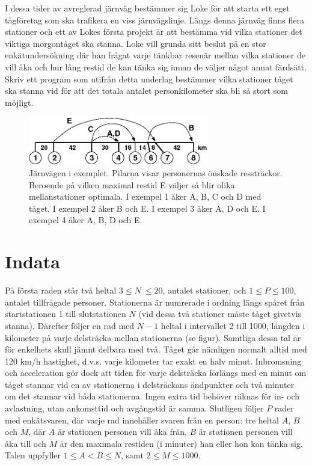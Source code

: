 
I dessa tider av avreglerad järnväg bestämmer sig Loke för att starta ett eget tågföretag som ska trafikera en viss järnvägslinje. Längs denna järnväg finns flera stationer och ett av Lokes första projekt är att bestämma vid vilka stationer det viktiga morgontåget ska stanna. Loke vill grunda sitt beslut på en stor enkätundersökning där han frågat varje tänkbar resenär mellan vilka stationer de vill åka och hur lång restid de kan tänka sig innan de väljer något annat färdsätt. Skriv ett program som utifrån detta underlag bestämmer vilka stationer tåget ska stanna vid för att det totala antalet personkilometer ska bli så stort som möjligt.

\begin{figure}[!h]
\begin{center}
\includegraphics[width=0.7\textwidth]{jarnvagen.png}
\end{center}
\caption{Järnvägen i exemplet. Pilarna visar personernas önskade ressträckor. Beroende på vilken maximal restid E väljer så blir olika mellanstationer optimala. I exempel 1 åker A, B, C och D med tåget. I exempel 2 åker B och E. I exempel 3 åker A, D och E. I exempel 4 åker A, B, D och E.}
\label{fig1}
\end{figure}

\section*{Indata}
På första raden står två heltal $3\le N\ \le 20$, antalet stationer, och $1 \le P \le 100$, antalet tillfrågade personer. Stationerna är numrerade i ordning längs spåret från startstationen 1 till slutstationen $N$ (vid dessa två stationer måste tåget givetvis stanna). Därefter följer en rad med $N-1$ heltal i intervallet 2 till 1000, längden i kilometer på varje delsträcka mellan stationerna (se figur). Samtliga dessa tal är för enkelhets skull jämnt delbara med två. Tåget går nämligen normalt alltid med 120 km/h hastighet, d.v.s. varje kilometer tar exakt en halv minut. Inbromsning och acceleration gör dock att tiden för varje delsträcka förlängs med en minut om tåget stannar vid en av stationerna i delsträckans ändpunkter och två minuter om det stannar vid båda stationerna. Ingen extra tid behöver räknas för in- och avlastning, utan ankomsttid och avgångstid är samma. Slutligen följer $P$ rader med enkätsvaren, där varje rad innehåller svaren från en person: tre heltal $A$, $B$ och $M$, där $A$ är stationen personen vill åka från, $B$ är stationen personen vill åka till och $M$ är den maximala restiden (i minuter) han eller hon kan tänka sig. Talen uppfyller $1\le A < B \le N$, samt $2\le M\le 1000$.

